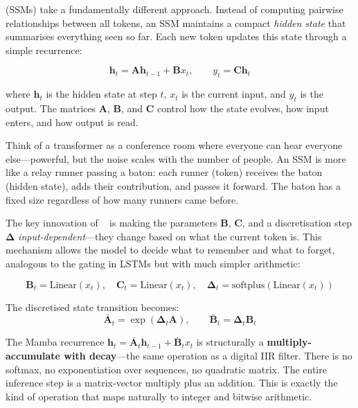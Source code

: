  (SSMs) take a fundamentally different
approach. Instead of computing pairwise relationships between all
tokens, an SSM maintains a compact \emph{hidden state} that
summarises everything seen so far. Each new token updates this state
through a simple recurrence:

\begin{equation}
  \mathbf{h}_t = \mathbf{A} \mathbf{h}_{t-1} + \mathbf{B} x_t,
  \qquad
  y_t = \mathbf{C} \mathbf{h}_t
  \label{eq:ssm-recurrence}
\end{equation}

where $\mathbf{h}_t$ is the hidden state at step $t$, $x_t$ is the
current input, and $y_t$ is the output. The matrices $\mathbf{A}$,
$\mathbf{B}$, and $\mathbf{C}$ control how the state evolves, how
input enters, and how output is read.

\begin{analogy}
Think of a transformer as a conference room where everyone can hear
everyone else---powerful, but the noise scales with the number of
people. An SSM is more like a relay runner passing a baton: each
runner (token) receives the baton (hidden state), adds their
contribution, and passes it forward. The baton has a fixed size
regardless of how many runners came before.
\end{analogy}

The key innovation of ~\cite{gu2024mamba} is making
the parameters $\mathbf{B}$, $\mathbf{C}$, and a discretisation step
$\boldsymbol{\Delta}$ \emph{input-dependent}---they change based on
what the current token is. This  mechanism allows
the model to decide what to remember and what to forget, analogous to
the gating in LSTMs but with much simpler arithmetic:

\begin{equation}
  \mathbf{B}_t = \text{Linear}(x_t), \quad
  \mathbf{C}_t = \text{Linear}(x_t), \quad
  \boldsymbol{\Delta}_t = \text{softplus}(\text{Linear}(x_t))
  \label{eq:mamba-selective}
\end{equation}

The discretised state transition becomes:
\begin{equation}
  \bar{\mathbf{A}}_t = \exp(\boldsymbol{\Delta}_t \mathbf{A}), \qquad
  \bar{\mathbf{B}}_t = \boldsymbol{\Delta}_t \mathbf{B}_t
  \label{eq:mamba-discretise}
\end{equation}

\begin{keyinsight}
The Mamba recurrence $\mathbf{h}_t = \bar{\mathbf{A}}_t
\mathbf{h}_{t-1} + \bar{\mathbf{B}}_t x_t$ is structurally a
\textbf{multiply-accumulate with decay}---the same operation as a
digital IIR filter. There is no softmax, no exponentiation over
sequences, no quadratic matrix. The entire inference step is a
matrix-vector multiply plus an addition. This is exactly the kind of
operation that maps naturally to integer and bitwise arithmetic.
\end{keyinsight}

